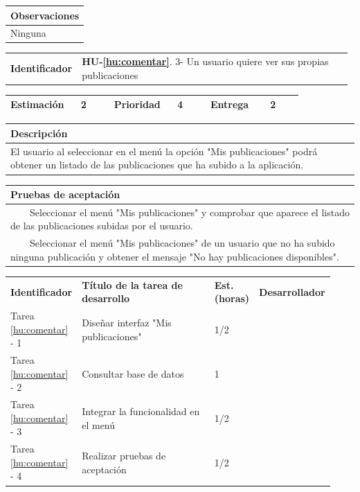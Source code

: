 \documentclass[11pt]{article}
\newcommand{\tabitem}{~~\llap{\textbullet}~~}
\begin{document}
\vspace{-0.8cm}
\begin{longtable}{p{1.028\linewidth}}
  \textbf{Observaciones}\\
  \midrule
  Ninguna\\
  \bottomrule
\end{longtable}

\begin{longtable}{p{0.18\linewidth}|p{0.8\linewidth}}
  \rowcolor{LightCyan}
  \textbf{Identificador} & \textbf{HU-\ref{hu:comentar}}. 3- Un usuario quiere ver sus propias publicaciones \\  
\end{longtable}
\vspace{-0.8cm}
\begin{longtable}{p{0.18\linewidth}|p{0.1\linewidth}|p{0.18\linewidth}|p{0.1\linewidth}|p{0.18\linewidth}|p{0.1\linewidth}}
  \toprule
  \textbf{Estimación} & 2 & \textbf{Prioridad} & 4 & \textbf{Entrega} & 2 \\
  \bottomrule
\end{longtable}
\vspace{-0.8cm}
\begin{longtable}{p{1.028\linewidth}}
  \textbf{Descripción}\\
  \midrule
 El usuario al seleccionar en el menú la opción "Mis publicaciones" podrá obtener un listado de las publicaciones que ha subido a la aplicación. \\
  \bottomrule
\end{longtable}
\vspace{-0.8cm}
\begin{longtable}{p{1.028\linewidth}}
  \textbf{Pruebas de aceptación}\\
  \midrule
  \tabitem Seleccionar el menú "Mis publicaciones" y comprobar que aparece el listado de las publicaciones subidas por el usuario.\\
  \tabitem Seleccionar el menú "Mis publicaciones" de un usuario que no ha subido ninguna publicación y obtener el mensaje "No hay publicaciones disponibles".\\
\end{longtable}
\vspace{-0.8cm}
\begin{longtable}{p{0.18\linewidth}|p{0.48\linewidth}|p{0.1\linewidth}|p{0.17\linewidth}}
  \toprule
  \textbf{Identificador} & \textbf{Título de la tarea de desarrollo} & \textbf{Est. (horas)} & \textbf{Desarrollador} \\
  Tarea \ref{hu:comentar} - 1 & Diseñar interfaz "Mis publicaciones" & 1/2 &\\
  Tarea \ref{hu:comentar} - 2 & Consultar base de datos & 1 & \\
  Tarea \ref{hu:comentar} - 3 & Integrar la funcionalidad en el menú & 1/2 & \\
  Tarea \ref{hu:comentar} - 4 & Realizar pruebas de aceptación & 1/2 &  \\
  \bottomrule
\end{longtable}
\end{document}

